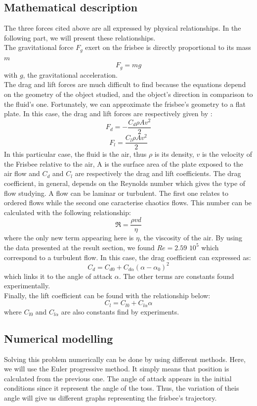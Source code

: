 \documentclass[10pt,a4paper]{report}
\begin{document}
\subsection{Mathematical description}
The three forces cited above are all expressed by physical relationships. In the following part, we will present these relationships.
\\The gravitational force $F_g$ exert on the frisbee is directly proportional to its mass $m$
\[F_g = m g\]
with $g$, the gravitational acceleration.
\\
The drag and lift forces are much difficult to find because the equations depend on the geometry of the object studied, and the object's direction in comparison to the fluid's one. Fortunately, we can approximate the frisbee's geometry to a flat plate. In this case, the drag and lift forces are respectively given by :
\[F_d = -\frac{C_d \rho A  v^2}{2}\]
\[F_l = \frac{C_l \rho A  v^2}{2}\]
In this particular case, the fluid is the air, thus $\rho$ is its density, $v$ is the velocity of the Frisbee relative to the air, A is the surface area of the plate exposed to the air flow and $C_d$ and $C_l$ are respectively the drag and lift coefficients.
The drag coefficient, in general, depends on the Reynolds number which gives the type of flow studying. A flow can be laminar or turbulent. The first one relates to ordered flows while the second one caracterise chaotics flows. This number can be calculated with the following relationship:
\[\Re = \frac{\rho v d}{\eta}\]
where the only new term appearing here is $\eta$, the viscosity of the air.
By using the data presented at the result section, we found $Re=2.59$ $10^5$ which correspond to a turbulent flow.
In this case, the drag coefficient can expressed as:
\[C_d = C_{d0} + C_{d\alpha}(\alpha-\alpha_0)^2\]
which links it to the angle of attack $\alpha$. The other terms are constants found experimentally\cite{art3, art5}.
\\Finally, the lift coefficient can be found with the relationship below:
\[C_l = C_{l0} + C_{l \alpha} \alpha\]
where $C_{l0}$ and $C_{l\alpha}$ are also constants find by experiments\cite{ art3, art5}.
\subsection{Numerical modelling}
Solving this problem numerically can be done by using different methods\cite{art6}. Here, we will use the Euler progressive method. It simply means that position is calculated from the previous one\cite{art3}.
The angle of attack appears in the initial conditions since it represent the angle of the toss. Thus, the variation of theis angle will give us different graphs representing the frisbee's trajectory.
\end{document}
